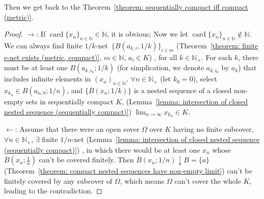 \documentclass[openany]{book}
\theoremstyle{plain}
\theoremstyle{definition}
\DeclareMathOperator{\card}{card}
\begin{document}
Then we get back to the Theorem~\ref{theorem: sequentially compact iff compact (metric)}. 
\begin{proof}

	$\to$: 
	If $\card \{x_n\}_{n \in \mathbb N} \in \mathbb N$, it is obvious; 
	Now we let $\card \{x_n\}_{n \in \mathbb N} \notin \mathbb N$. 
	We can always find finite $1/k$-net~$\{B(a_{k, i}, 1/k)\}_{i \in m}$
		(Theorem~\ref{theorem: finite e-net exists (metric, compact)}, 
			$m \in \mathbb N$, $a_i \in K$)%
	, for all $k \in \mathbb N_+$. 
	For each $k$, there must be at least one $B(a_{k, i_0}; 1/k)$
		(for simplication, we denote $a_{k, i_0}$ by $a_k$)
	that includes infinite elements in $(x_n)_{n \in \mathbb N}$. 
	$\forall n \in \mathbb N_+$
		(let $k_0 = 0$), 
	select $x_{k_n} \in B(a_{n, 0}; 1/n)$, and $\{\overline B(x_n; 1/k)\}$ is a nested sequence of a closed non-empty sets in sequentially compact $K$,
		(Lemma~\ref{lemma: intersection of closed nested sequence (sequentially compact)})
	$\lim_{n\to \infty} x_{k_n} \in K$.
	
	$\gets$: 
	Assume that there were an open cover $\varOmega$ over $K$ having no finite subcover, $\forall n \in \mathbb N_+$, $\exists$ finite $1/n$-net 
		(Lemma~\ref{lemma: intersection of closed nested sequence (sequentially compact)})%
	, in which there would be at least one $x_n$ whose $\overline B(x_n;\frac{1}{n})$ can't be covered finitely. 
	Then $\overline B(x_n; 1/n) \downarrow B = \{a\}$ 
		(Theorem~\ref{theorem: compact nested sequences have non-empty limit})
	can't be finitely covered by any subcover of $\varOmega$, 
	which means $\varOmega$ can't cover the whole $K$, leading to the contradiction.
\end{proof}
\end{document}

